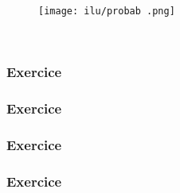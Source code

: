 \begin{figure}[H]\begin{center}\texttt{[image: ilu/probab .png]}\end{center}\end{figure}


\begin{lstlisting}[language=html]
  
\end{lstlisting}

















\subsubsection*{Exercice }
\subsubsection*{Exercice }
\subsubsection*{Exercice }
\subsubsection*{Exercice }










